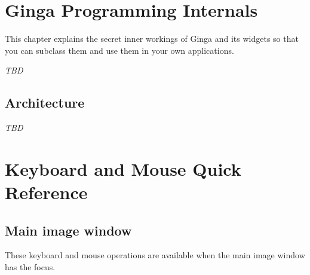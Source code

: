 \documentclass[11pt]{report}
\begin{document}
\chapter{Ginga Programming Internals}
\label{ch:internals}
This chapter explains the secret inner workings of Ginga and its widgets
so that you can subclass them and use them in your own applications.

\emph{TBD}

\section{Architecture}

\emph{TBD}

\appendix    %

\chapter{Keyboard and Mouse Quick Reference}
\label{app:mousekbdref}

\section{Main image window}
These keyboard and mouse operations are available when the main image
window has the focus.
\end{document}
